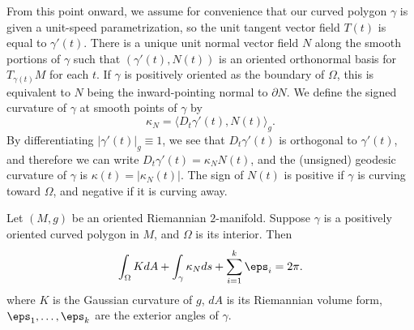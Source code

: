 From this point onward, we assume for convenience that our curved polygon $\gamma$ is given a unit-speed parametrization, so the unit tangent vector field $T(t)$ is equal 
to $\gamma'(t)$. There is a unique unit normal vector field $N$ along the smooth portions of $\gamma$ such that $(\gamma'(t),N(t))$ is an oriented orthonormal basis for 
$T_{\gamma(t)}M$ for each $t$. If $\gamma$ is positively oriented as the boundary of $\Omega$, this is equivalent to $N$ being the inward-pointing normal to $\partial N$. 
We define the signed curvature of $\gamma$ at smooth points of $\gamma$ by
\[\kappa_N=\langle D_t\gamma'(t),N(t)\rangle_g.\]
By differentiating $|\gamma'(t)|_g\equiv 1$, we see that $D_t\gamma'(t)$ is orthogonal to $\gamma'(t)$, and therefore we can write $D_t\gamma'(t)=\kappa_NN(t)$, and the 
(unsigned) geodesic curvature of $\gamma$ is $\kappa(t)=|\kappa_N(t)|$. The sign of $N(t)$ is positive if $\gamma$ is curving toward $\Omega$, and negative if it is 
curving away.
\begin{theorem}
Let $(M,g)$ be an oriented Riemannian $2$-manifold. Suppose $\gamma$ is a positively oriented curved polygon in $M$, and $\Omega$ is its interior. Then
\begin{align}\label{Guass Bonnet formula-1}
\int_{\Omega}KdA+\int_{\gamma}\kappa_Nds+\sum_{i=1}^{k}\eps_i=2\pi.
\end{align}
where $K$ is the Gaussian curvature of $g$, $dA$ is its Riemannian volume form, $\eps_1,\dots,\eps_k$ are the exterior angles of $\gamma$.
\end{theorem}
